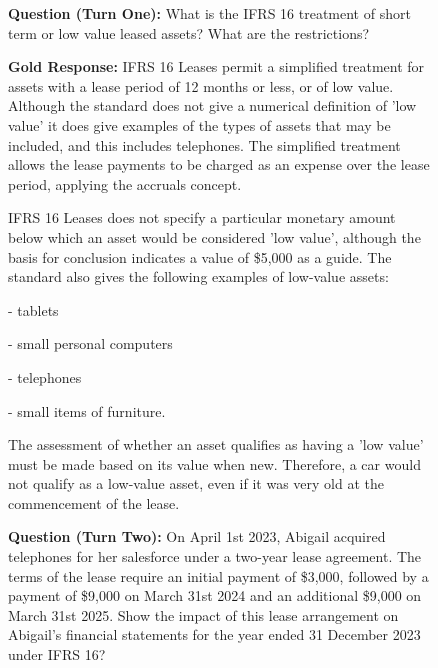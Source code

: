 \begin{figure}[ht!]

\centering
\small

\begin{tcolorbox}[
    boxsep=1pt,
    left=2pt,right=2pt,top=2pt,bottom=2pt,
    colback=blue!5!white,
    colframe=blue!40!black,
    before skip=2pt,
    after skip=2pt,
    sharp corners
]
\textbf{Question (Turn One):}
What is the IFRS 16 treatment of short term or low value leased assets? 
What are the restrictions?
\end{tcolorbox}

\begin{tcolorbox}[
    boxsep=1pt,
    left=2pt,right=2pt,top=2pt,bottom=2pt,
    colback=green!2!white,
    colframe=green!25!black,
    before skip=1pt,
    after skip=3pt,
    sharp corners
]
\small
\textbf{Gold Response:}
IFRS 16 Leases permit a simplified treatment for assets with a lease period of 12 months or less, or of low value. Although the standard does not give a numerical definition of 'low value' it does give examples of the types of assets that may be included, and this includes telephones. The simplified treatment allows the lease payments to be charged as an expense over the lease period, applying the accruals concept.

IFRS 16 Leases does not specify a particular monetary amount below which an asset would be considered 'low value', although the basis for conclusion indicates a value of \$5,000 as a guide. The standard also gives the following examples of low-value assets:

- tablets

- small personal computers

- telephones

- small items of furniture.

The assessment of whether an asset qualifies as having a 'low value' must be made based on its value when new. Therefore, a car would not qualify as a low-value asset, even if it was very old at the commencement of the lease.
\end{tcolorbox}

\begin{tcolorbox}[
    boxsep=1pt,
    left=2pt,right=2pt,top=2pt,bottom=2pt,
    colback=blue!5!white,
    colframe=blue!40!black,
    before skip=3pt,
    after skip=1pt,
    sharp corners
]
\small
\textbf{Question (Turn Two):}
On April 1st 2023, Abigail acquired telephones for her salesforce under a 
two-year lease agreement. The terms of the lease require an initial payment 
of \$3,000, followed by a payment of \$9,000 on March 31st 2024 and an 
additional \$9,000 on March 31st 2025. Show the impact of this lease 
arrangement on Abigail's financial statements for the year ended 
31 December 2023 under IFRS 16?
\end{tcolorbox}


\end{figure}
